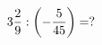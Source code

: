 \documentclass[preview]{standalone}
\begin{document}
\begin{align*}
3 { 2 \over 9 }  :  \left( - { 5 \over 45 } \right) = ?
\end{align*}
\end{document}
